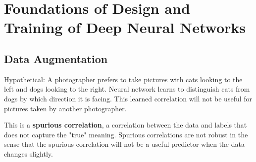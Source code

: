 \documentclass{report}
\begin{document}
\chapter{Foundations of Design and Training of Deep Neural Networks}

\section{Data Augmentation}

\begin{definition}
    Hypothetical: A photographer prefers to take pictures with cats looking to the left and dogs looking to the right. Neural network learns to distinguish cats from dogs by which direction it is facing. This learned correlation will not be useful for pictures taken by another photographer.

    This is a \textbf{spurious correlation}, a correlation between the data and labels that does not capture the "true" meaning. Spurious correlations are not robust in the sense that the spurious correlation will not be a useful predictor when the data changes slightly.
\end{definition}
\end{document}
